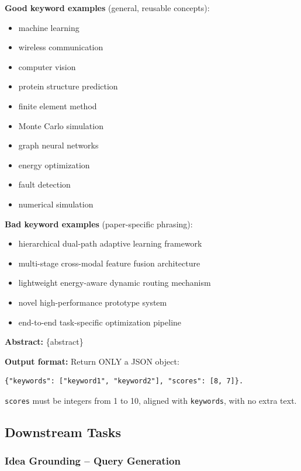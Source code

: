 \begin{tcolorbox}[breakable, colback=black!5!white, colframe=black!60!black,
  left=1ex, right=1ex, top=0.5ex, bottom=0.5ex,
  fontupper=\small\ttfamily, fontlower=\small\ttfamily,
  title=\textbf{Keyword Extraction}]
\textbf{Good keyword examples} (general, reusable concepts):
\begin{itemize}\small
\item machine learning
\item wireless communication
\item computer vision
\item protein structure prediction
\item finite element method
\item Monte Carlo simulation
\item graph neural networks
\item energy optimization
\item fault detection
\item numerical simulation
\end{itemize}

\textbf{Bad keyword examples} (paper-specific phrasing):
\begin{itemize}\small
\item hierarchical dual-path adaptive learning framework
\item multi-stage cross-modal feature fusion architecture
\item lightweight energy-aware dynamic routing mechanism
\item novel high-performance prototype system
\item end-to-end task-specific optimization pipeline
\end{itemize}

\textbf{Abstract:}
\{abstract\}

\textbf{Output format:}
Return ONLY a JSON object:
\begin{verbatim}
{"keywords": ["keyword1", "keyword2"], "scores": [8, 7]}.
\end{verbatim}
\texttt{scores} must be integers from 1 to 10, aligned with \texttt{keywords}, with no extra text.
\end{tcolorbox}

\subsection{Downstream Tasks}
\label{app:prompt_downstream}

\subsubsection{Idea Grounding -- Query Generation}
\label{prompt:task1-query-gen}

